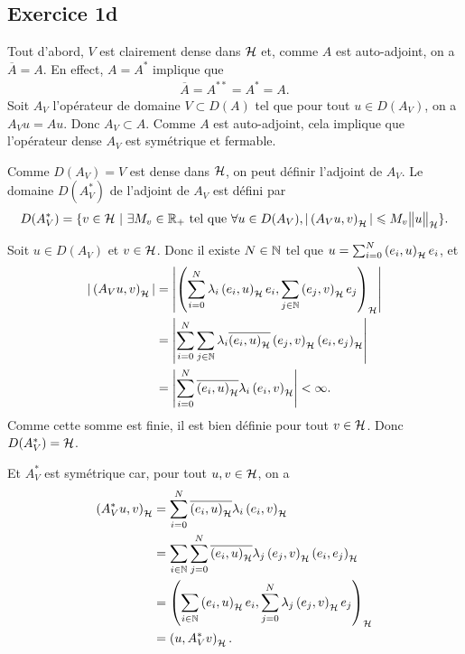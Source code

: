 \subsection*{Exercice 1d}

Tout d'abord, $V$ est clairement dense dans $\mathcal{H}$ et,
comme $A$ est auto-adjoint, on a $\overline A = A$.
En effect, $A = A^*$ implique que
\begin{align}
    \overline A = A^{**} = A^* = A.
\end{align}
%
Soit $A_V$ l'opérateur de domaine $V \subset D(A)$ tel que pour
tout $u \in D(A_V)$, on a $A_V u = Au$. Donc $A_V \subset A$.
Comme $A$ est auto-adjoint, cela implique que l'opérateur dense
$A_V$ est symétrique et fermable.

Comme $D(A_V) = V$ est dense dans $\mathcal{H}$, on peut définir
l'adjoint de $A_V$. Le domaine $D(A_V^*)$ de l'adjoint de $A_V$ est
défini par
\begin{align}
    D(A_V^*) = \{v \in \hilbert \ |
    \  \exists M_v \in \R_+ \text{ tel que} \forall u \in D(A_V),
    |\psh{A_V u}{v}| \leqslant M_v \normeh{u} \}.
\end{align}

Soit $u \in D(A_V)$ et $v \in \mathcal{H}$. Donc il existe ${N \in \mathbb{N}}$
tel que $u = \sum_{i=0}^N \left( e_i, u \right)_{\mathcal{H}} e_i$, et
\begin{align}
    |\left( A_V u, v \right)_{\mathcal{H}}| &= \left| \left( \sum_{i=0}^N \lambda_i \left( e_i, u \right)_{\mathcal{H}} e_i, \sum_{j \in \mathbb{N}} \left( e_j, v \right)_{\mathcal{H}} e_j \right)_{\mathcal{H}} \right| \\
    &= \left| \sum_{i=0}^N \sum_{j \in \mathbb{N}} \lambda_i
    \overline{\left( e_i, u \right)_{\mathcal{H}}} \left( e_j, v \right)_{\mathcal{H}} \left( e_i, e_j \right)_{\mathcal{H}} \right| \\
    &= \left| \sum_{i=0}^N \overline{\left( e_i, u \right)_{\mathcal{H}}} \lambda_i \left( e_i, v \right)_{\mathcal{H}} \right|
    < \infty.
\end{align}
%
Comme cette somme est finie, il est bien définie pour tout
$v \in \mathcal{H}$. Donc $D(A_V^*) = \mathcal{H}$.

Et $A_V^*$ est symétrique car, pour tout $u,v \in \mathcal{H}$,
on a
\begin{align}
    \psh{A_V^* u}{v}
    &= \sum_{i=0}^N \overline{\psh{e_i}{u}} \lambda_i \psh{e_i}{v} \\
%
    &= \sum_\inn{i} \sum_{j=0}^N
    \overline{\psh{e_i}{u}} \lambda_j \psh{e_j}{v} \psh{e_i}{e_j} \\
%
    &= \psh{\sum_\inn{i} \psh{e_i}{u} e_i}
    {\sum_{j=0}^N \lambda_j \psh{e_j}{v} e_j} \\
    &= \psh{u}{A_V^* v}.
\end{align}

